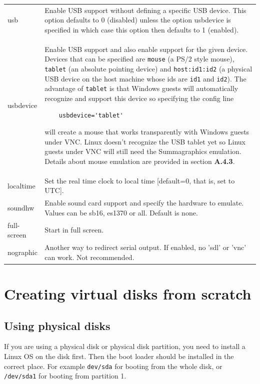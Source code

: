 \documentclass[11pt,twoside,final,openright]{report}
\begin{document}
\begin{tabular}{lp{10cm}}

usb &           Enable USB support without defining a specific USB device.
This option defaults to 0 (disabled) unless the option usbdevice is
specified in which case this option then defaults to 1 (enabled).\\

usbdevice &     Enable USB support and also enable support for the given
device.  Devices that can be specified are {\small {\tt mouse}} (a PS/2 style
mouse), {\small {\tt tablet}} (an absolute pointing device) and
{\small {\tt host:id1:id2}} (a physical USB device on the host machine whose
ids are {\small {\tt id1}} and {\small {\tt id2}}).  The advantage
of {\small {\tt tablet}} is that Windows guests will automatically recognize
and support this device so specifying the config line

{\small
\begin{verbatim}
    usbdevice='tablet'
\end{verbatim}
}

will create a mouse that works transparently with Windows guests under VNC.
Linux doesn't recognize the USB tablet yet so Linux guests under VNC will
still need the Summagraphics emulation.
Details about mouse emulation are provided in section \textbf{A.4.3}.\\

localtime &     Set the real time clock to local time [default=0, that is, set to UTC].\\

soundhw   &     Enable sound card support and specify the hardware to emulate. Values can be sb16, es1370 or all. Default is none.\\

full-screen   & Start in full screen.\\

nographic &     Another way to redirect serial output. If enabled, no 'sdl' or 'vnc' can work. Not recommended.\\

\end{tabular}


\section{Creating virtual disks from scratch}
\subsection{Using physical disks}
If you are using a physical disk or physical disk partition, you need to install a Linux OS on the disk first. Then the boot loader should be installed in the correct place. For example {\small {\tt dev/sda}} for booting from the whole disk, or {\small {\tt /dev/sda1}} for booting from partition 1.
\end{document}
